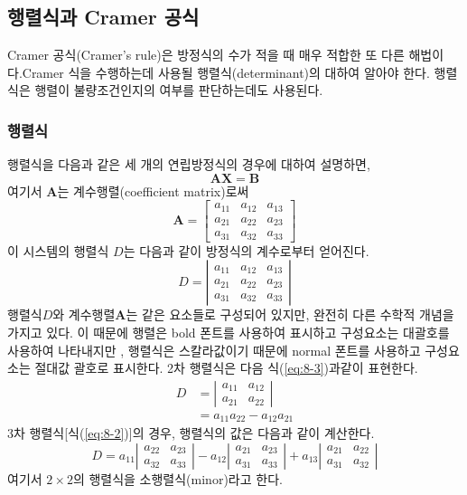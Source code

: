 \subsection{행렬식과 Cramer 공식}
Cramer 공식(Cramer's rule)은 방정식의 수가 적을 때 매우 적합한 또 다른 해법이다.Cramer 식을 수행하는데 사용될 행렬식(determinant)의 대하여 알아야 한다. 행렬식은 행렬이 불량조건인지의 여부를 판단하는데도 사용된다.
\subsubsection{행렬식}
행렬식을 다음과 같은 세 개의 연립방정식의 경우에 대하여 설명하면,
\begin{equation*}
\mathbf{AX}=\mathbf{B}
\end{equation*}
여기서 $\mathbf{A}$는 계수행렬(coefficient matrix)로써
\begin{equation*}
\mathbf{A}=\begin{bmatrix}a_{11}&a_{12}&a_{13}\\a_{21}&a_{22}&a_{23}\\a_{31}&a_{32}&a_{33}\end{bmatrix}
\end{equation*}
이 시스템의 행렬식 $D$는 다음과 같이 방정식의 계수로부터 얻어진다.
\begin{equation}\label{eq:8-2}
D=\left|\begin{array}{ccc}a_{11}&a_{12}&a_{13}\\a_{21}&a_{22}&a_{23}\\a_{31}&a_{32}&a_{33}\end{array}\right|
\end{equation}
행렬식$D$와 계수행렬$\mathbf{A}$는 같은 요소들로 구성되어 있지만, 완전히 다른 수학적 개념을 가지고 있다. 이 때문에 행렬은 bold 폰트를 사용하여 표시하고 구성요소는 대괄호를 사용하여 나타내지만 , 행렬식은 스칼라값이기 때문에 normal 폰트를 사용하고 구성요소는 절대값 괄호로 표시한다. 2차 행렬식은 다음 식(\ref{eq:8-3})과같이 표현한다.
\begin{align}
D&=\left|\begin{array}{cc}a_{11}&a_{12}\\a_{21}&a_{22}\end{array}\right|\\
&=a_{11}a_{22}-a_{12}a_{21}\label{eq:8-3}
\end{align}
3차 행렬식[식(\ref{eq:8-2})]의 경우, 행렬식의 값은 다음과 같이 계산한다.
\begin{equation}
D=a_{11}\left|\begin{array}{cc}a_{22}&a_{23}\\a_{32}&a_{33}\end{array}\right|-a_{12}\left|\begin{array}{cc}a_{21}&a_{23}\\a_{31}&a_{33}\end{array}\right|+a_{13}\left|\begin{array}{cc}a_{21}&a_{22}\\a_{31}&a_{32}\end{array}\right|
\end{equation}
여기서 $2\times2$의 행렬식을 소행렬식(minor)라고 한다.
